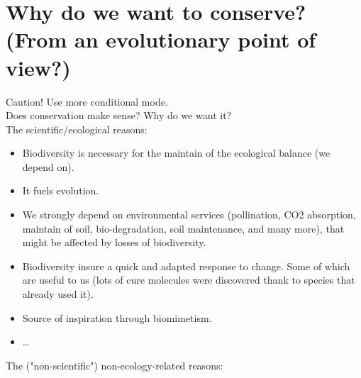 \documentclass[12pt]{article}
\begin{document}
\section{Why do we want to conserve? (From an evolutionary point of view?)}
Caution! Use more conditional mode.\\
Does conservation make sense?
Why do we want it?\\
The scientific/ecological reasons:
\begin{itemize}
    \item Biodiversity is necessary for the maintain of the ecological balance (we depend on).
    \item It fuels evolution.
    \item We strongly depend on environmental services (pollination, CO2 absorption, maintain of soil, bio-degradation, soil maintenance, and many more), that might be affected by losses of biodiversity. 
    \item Biodiversity insure a quick and adapted response to change. Some of which are useful to us (lots of cure molecules were discovered thank to species that already used it).
    \item Source of inspiration through biomimetism.
    \item \dots
\end{itemize}
The ("non-scientific") non-ecology-related reasons:
\end{document}
